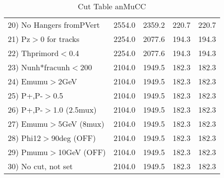 \begin{table}[h!]
\begin{tabular}{||l||r|r|r|r||}
 20) No Hangers fromPVert &      2554.0 &      2359.2 &       220.7 &       220.7 \\
 21) Pz$>$0 for tracks    &      2254.0 &      2077.6 &       194.3 &       194.3 \\
 22) Thprimord$<$0.4      &      2254.0 &      2077.6 &       194.3 &       194.3 \\
 23) Nunh*fracunh$<$200   &      2104.0 &      1949.5 &       182.3 &       182.3 \\
 24) Emumu$>$2GeV         &      2104.0 &      1949.5 &       182.3 &       182.3 \\
 25) P+,P-$>$0.5          &      2104.0 &      1949.5 &       182.3 &       182.3 \\
 26) P+,P-$>$1.0 (2.5mux) &      2104.0 &      1949.5 &       182.3 &       182.3 \\
 27) Emumu$>$5GeV  (8mux) &      2104.0 &      1949.5 &       182.3 &       182.3 \\
 28) Phi12$>$90deg  (OFF) &      2104.0 &      1949.5 &       182.3 &       182.3 \\
 29) Pmumu$>$10GeV  (OFF) &      2104.0 &      1949.5 &       182.3 &       182.3 \\
 30) No cut, not set      &      2104.0 &      1949.5 &       182.3 &       182.3 \\
 \hline
 \hline
 \end{tabular}
 \caption{Cut Table  anMuCC }
 \label{tab-cut_anmcc}
 \end{table}
